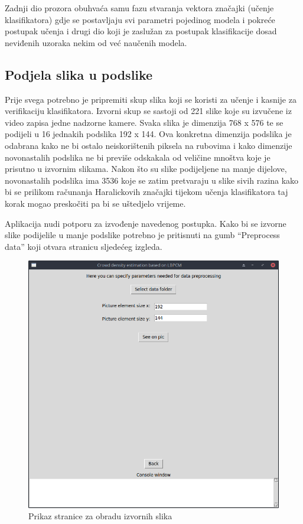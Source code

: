 \documentclass[times, utf8, zavrsni]{fer}
\begin{document}
\bigbreak

Zadnji dio prozora obuhvaća samu fazu stvaranja vektora značajki (učenje
klasifikatora) gdje se postavljaju svi parametri pojedinog modela i pokreće
postupak učenja i drugi dio koji je zaslužan za postupak klasifikacije
dosad neviđenih uzoraka nekim od već naučenih modela.


\subsection{Podjela slika u podslike}

Prije svega potrebno je pripremiti skup slika koji se koristi za učenje i 
kasnije za verifikaciju klasifikatora. Izvorni skup se sastoji od 221 slike
koje su izvučene iz video zapisa jedne nadzorne kamere. Svaka slika je dimenzija
768 x 576 te se podijeli u 16 jednakih podslika 192 x 144. Ova konkretna dimenzija
podslika je odabrana kako ne bi ostalo neiskorištenih piksela na rubovima i 
kako dimenzije novonastalih podslika ne bi previše odskakala od veličine mnoštva
koje je prisutno u izvornim slikama. Nakon što su slike podijeljene na manje dijelove,
novonastalih podslika ima 3536 koje se zatim pretvaraju u slike sivih razina kako
bi se prilikom računanja Haralickovih značajki tijekom učenja klasifikatora taj
korak mogao preskočiti pa bi se uštedjelo vrijeme. 

\bigbreak

Aplikacija nudi potporu za izvođenje navedenog postupka. Kako bi se izvorne
slike podijelile u manje podslike potrebno je pritisnuti na gumb \enquote{Preprocess data}
koji otvara stranicu sljedećeg izgleda.

\begin{figure}[ht]
\centering
\includegraphics[scale=0.4]{img/preprocessdata.png}
\caption{Prikaz stranice za obradu izvornih slika}
\end{figure}
\end{document}
